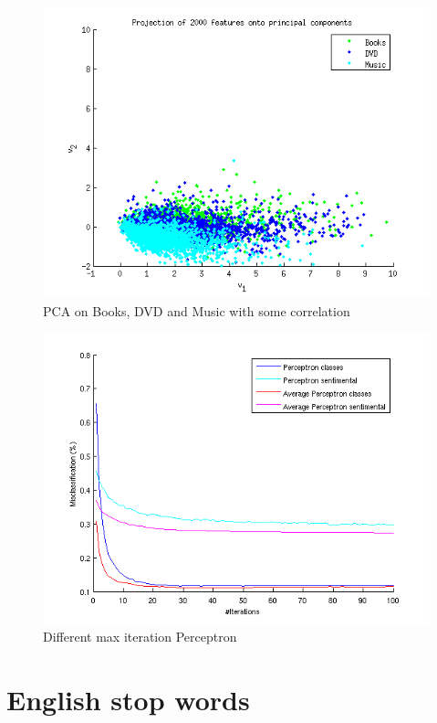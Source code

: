 \begin{figure}[H]
\centering
\includegraphics[scale = 1]{../Plottar/pca_somecorr.png}
\caption{PCA on Books, DVD and Music with some correlation}
\end{figure} 

\begin{figure}[H]
\centering
\includegraphics[scale = 1]{../Plottar/perceptron_2000words_unigram_10foldcv_classes-high_sentimental-low.png}
\caption{Different max iteration Perceptron}
\end{figure} 

\chapter{English stop words}

